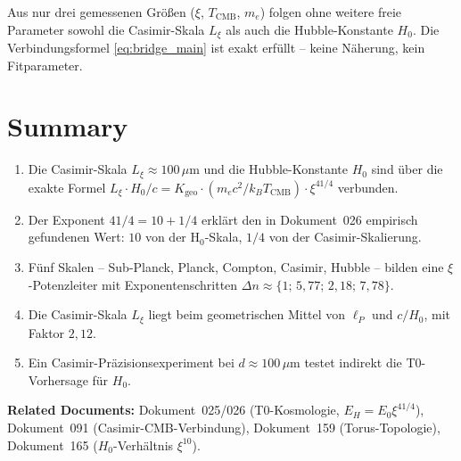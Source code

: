 \begin{foundation}
    Aus nur drei gemessenen Größen ($\xi$, $T_\text{CMB}$, $m_e$) folgen
    ohne weitere freie Parameter sowohl die Casimir-Skala $L_\xi$ als auch
    die Hubble-Konstante $H_0$. Die Verbindungsformel \eqref{eq:bridge_main}
    ist exakt erfüllt -- keine Näherung, kein Fitparameter.
\end{foundation}

\section{Summary}
\label{sec:summary}

\begin{foundation}
    \begin{enumerate}
        \item Die Casimir-Skala $L_\xi \approx 100\,\mu\text{m}$ und die
              Hubble-Konstante $H_0$ sind über die exakte Formel
              $L_\xi \cdot H_0/c = K_\text{geo} \cdot (m_e c^2/k_B T_\text{CMB}) \cdot \xi^{41/4}$
              verbunden.
        \item Der Exponent $41/4 = 10 + 1/4$ erklärt den in Dokument~026
              empirisch gefundenen Wert: $10$ von der H$_0$-Skala,
              $1/4$ von der Casimir-Skalierung.
        \item Fünf Skalen -- Sub-Planck, Planck, Compton, Casimir, Hubble --
              bilden eine $\xi$-Potenzleiter mit Exponentenschritten
              $\Delta n \approx \{1;\,5{,}77;\,2{,}18;\,7{,}78\}$.
        \item Die Casimir-Skala $L_\xi$ liegt beim geometrischen Mittel
              von $\ell_P$ und $c/H_0$, mit Faktor $2{,}12$.
        \item Ein Casimir-Präzisionsexperiment bei $d \approx 100\,\mu\text{m}$
              testet indirekt die T0-Vorhersage für $H_0$.
    \end{enumerate}
\end{foundation}

\vspace{1.5em}
\noindent\textbf{Related Documents:}
Dokument~025/026 (T0-Kosmologie, $E_H = E_0\xi^{41/4}$),
Dokument~091 (Casimir-CMB-Verbindung),
Dokument~159 (Torus-Topologie),
Dokument~165 ($H_0$-Verhältnis $\xi^{10}$).

